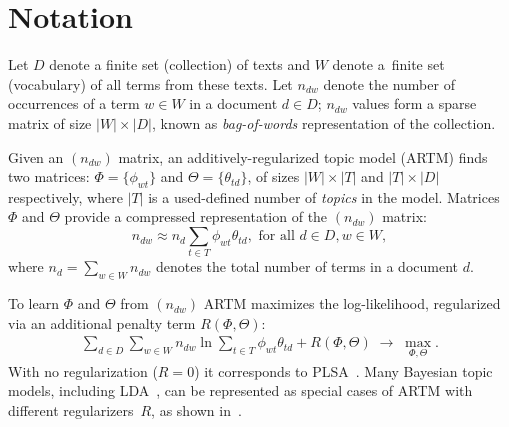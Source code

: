 \documentclass[russian,english]{llncs}
\begin{document}
\section{Notation}
\label{sec:Notation}

Let
$D$ denote a finite set (collection) of texts and
$W$ denote a~finite set (vocabulary) of all terms from these texts.
Let
$n_{dw}$ denote the number of occurrences of a term $w \in W$ in a document $d \in D$;
$n_{dw}$ values form a sparse matrix of size $|W| \times |D|$,
known as \emph{bag-of-words} representation of the collection.

Given an $(n_{dw})$ matrix, an additively-regularized topic model (ARTM) finds two matrices:
$\Phi = \{\phi_{wt}\}$ and $\Theta = \{\theta_{td}\}$,
of sizes $|W| \times |T|$ and $|T| \times |D|$ respectively,
where $|T|$ is a used-defined number of \emph{topics} in the model.
Matrices $\Phi$ and $\Theta$
provide a compressed representation of the $(n_{dw})$ matrix:
\[
n_{dw} \approx n_d \sum_{t \in T} \phi_{wt} \theta_{td}, \text { for all } d \in D, w \in W,
\]
where $n_d = \sum_{w \in W} n_{dw}$ denotes the total number of terms in a document $d$.

To learn $\Phi$ and $\Theta$ from $(n_{dw})$ ARTM maximizes
the log-likelihood, regularized via an additional penalty term $R(\Phi, \Theta)$:
\begin{gather}
\label{eq:ARTM}
    \sum_{d\in D}\sum_{w\in W} n_{dw} \ln \sum_{t\in T} \phi_{wt} \theta_{td} + R(\Phi, \Theta)
    \;\to\; \max_{\Phi,\Theta}.
\end{gather}
With no regularization (${R=0}$) it corresponds to PLSA~\cite{hofmann99plsi}.
Many Bayesian topic models, including LDA~\cite{blei03latent}, can be represented
as special cases of ARTM with different regularizers~$R$,
as shown in~\cite{voron14mlj,voron14aist}.
\end{document}
